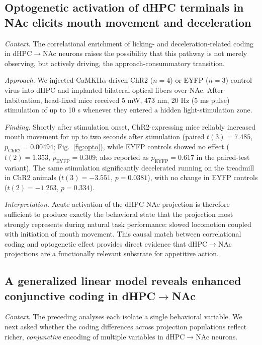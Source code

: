 \documentclass[11pt]{article}
\begin{document}
\subsection{Optogenetic activation of dHPC terminals in NAc elicits mouth movement and deceleration}

\textit{Context.} The correlational enrichment of licking- and deceleration-related coding in dHPC$\rightarrow$NAc neurons raises the possibility that this pathway is not merely observing, but actively driving, the approach-consummatory transition.

\textit{Approach.} We injected CaMKII$\alpha$-driven ChR2 ($n=4$) or EYFP ($n=3$) control virus into dHPC and implanted bilateral optical fibers over NAc. After habituation, head-fixed mice received 5 mW, 473 nm, 20 Hz (5 ms pulse) stimulation of up to 10 s whenever they entered a hidden light-stimulation zone.

\textit{Finding.} Shortly after stimulation onset, ChR2-expressing mice reliably increased mouth movement for up to two seconds after stimulation (paired $t(3)=7.485$, $p_{\text{ChR2}}=0.00494$; Fig.~\ref{fig:opto}), while EYFP controls showed no effect ($t(2)=1.353$, $p_{\text{EYFP}}=0.309$; also reported as $p_{\text{EYFP}}=0.617$ in the paired-test variant). The same stimulation significantly decelerated running on the treadmill in ChR2 animals ($t(3)=-3.551$, $p=0.0381$), with no change in EYFP controls ($t(2)=-1.263$, $p=0.334$).

\textit{Interpretation.} Acute activation of the dHPC-NAc projection is therefore sufficient to produce exactly the behavioral state that the projection most strongly represents during natural task performance: slowed locomotion coupled with initiation of mouth movement. This causal match between correlational coding and optogenetic effect provides direct evidence that dHPC$\rightarrow$NAc projections are a functionally relevant substrate for appetitive action.

\subsection{A generalized linear model reveals enhanced conjunctive coding in dHPC$\rightarrow$NAc}

\textit{Context.} The preceding analyses each isolate a single behavioral variable. We next asked whether the coding differences across projection populations reflect richer, \emph{conjunctive} encoding of multiple variables in dHPC$\rightarrow$NAc neurons.
\end{document}
